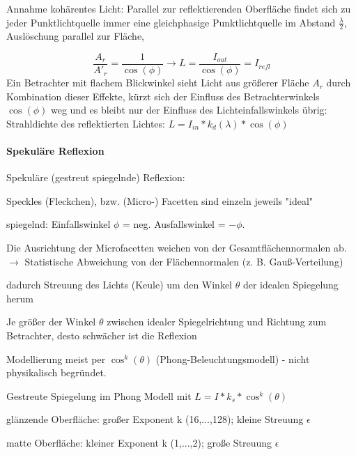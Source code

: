 \documentclass[landscape]{article}
\begin{document}
\begin{multicols}{3}
  
  Annahme kohärentes Licht: Parallel zur reflektierenden Oberfläche findet sich zu jeder Punktlichtquelle immer eine gleichphasige Punktlichtquelle im Abstand $\frac{\lambda}{2}$, Auslöschung parallel zur Fläche,
  
  
  $$\frac{A_r}{A'_r}=\frac{1}{\cos(\phi)} \rightarrow L=\frac{I_{out}}{\cos(\phi)}=I_{refl}$$
  Ein Betrachter mit flachem Blickwinkel sieht Licht aus größerer Fläche $A_r$ durch Kombination dieser Effekte, kürzt sich der Einfluss des Betrachterwinkels $\cos(\phi)$ weg und es bleibt nur der Einfluss des Lichteinfallswinkels übrig: Strahldichte des reflektierten Lichtes: $L=I_{in}*k_d(\lambda)*\cos(\phi)$
  
  \paragraph{Spekuläre Reflexion}
  Spekuläre (gestreut spiegelnde) Reflexion:
  \begin{itemize*}
    \item Speckles (Fleckchen), bzw. (Micro-) Facetten sind einzeln jeweils "ideal"
    \item spiegelnd: Einfallswinkel $\phi$ = neg. Ausfallswinkel = $-\phi$.
    \item Die Ausrichtung der Microfacetten weichen von der Gesamtflächennormalen ab. $\rightarrow$ Statistische Abweichung von der Flächennormalen (z. B. Gauß-Verteilung)
    \item dadurch Streuung des Lichts (Keule) um den Winkel $\theta$ der idealen Spiegelung herum
    \item Je größer der Winkel $\theta$ zwischen idealer Spiegelrichtung und Richtung zum Betrachter, desto schwächer ist die Reflexion
    \item Modellierung meist per $\cos^k(\theta)$ (Phong-Beleuchtungsmodell) - nicht physikalisch begründet.
  \end{itemize*}
  
  
  Gestreute Spiegelung im Phong Modell mit $L=I*k_s*\cos^k(\theta)$
  \begin{itemize*}
    \item glänzende Oberfläche: großer Exponent k (16,...,128); kleine Streuung $\epsilon$
    \item matte Oberfläche: kleiner Exponent k (1,...,2); große Streuung $\epsilon$
  \end{itemize*}
  

\end{multicols}
\end{document}
